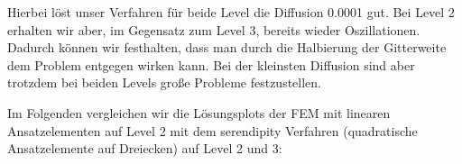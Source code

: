 Hierbei löst unser Verfahren für beide Level die Diffusion 0.0001 gut. Bei Level 2 erhalten wir aber, im Gegensatz zum Level 3, bereits wieder Oszillationen. Dadurch können wir festhalten, dass man durch die Halbierung der Gitterweite dem Problem entgegen wirken kann. Bei der kleinsten Diffusion sind aber trotzdem bei beiden Levels große Probleme festzustellen.

Im Folgenden vergleichen wir die Lösungsplots der FEM mit linearen Ansatzelementen auf Level 2 mit dem serendipity Verfahren (quadratische Ansatzelemente auf Dreiecken) auf Level 2 und 3:
 
\begin{figure}[H]
	\centering
\end{figure}

